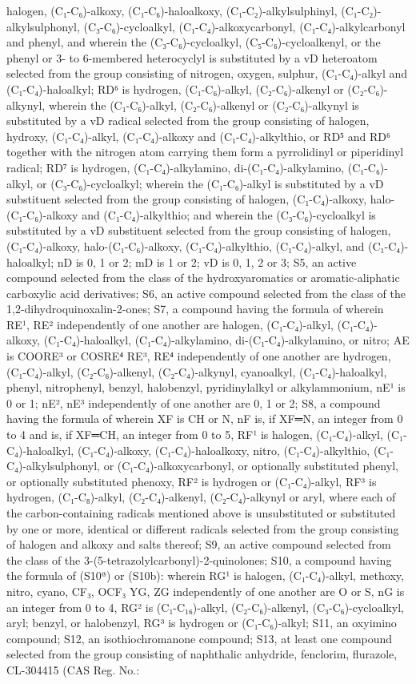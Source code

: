 \documentclass[11pt,a4paper]{article}
\begin{document}
halogen, (C₁-C₆)-alkoxy, (C₁-C₆)-haloalkoxy, (C₁-C₂)-alkylsulphinyl, (C₁-C₂)-alkylsulphonyl, (C₃-C₆)-cycloalkyl, (C₁-C₄)-alkoxycarbonyl, (C₁-C₄)-alkylcarbonyl and phenyl, and wherein the (C₃-C₆)-cycloalkyl, (C₅-C₆)-cycloalkenyl, or the phenyl or 3- to 6-membered heterocyclyl is substituted by a vD heteroatom selected from the group consisting of nitrogen, oxygen, sulphur, (C₁-C₄)-alkyl and (C₁-C₄)-haloalkyl; RD⁶ is hydrogen, (C₁-C₆)-alkyl, (C₂-C₆)-alkenyl or (C₂-C₆)-alkynyl, wherein the (C₁-C₆)-alkyl, (C₂-C₆)-alkenyl or (C₂-C₆)-alkynyl is substituted by a vD radical selected from the group consisting of halogen, hydroxy, (C₁-C₄)-alkyl, (C₁-C₄)-alkoxy and (C₁-C₄)-alkylthio, or RD⁵ and RD⁶ together with the nitrogen atom carrying them form a pyrrolidinyl or piperidinyl radical; RD⁷ is hydrogen, (C₁-C₄)-alkylamino, di-(C₁-C₄)-alkylamino, (C₁-C₆)-alkyl, or (C₃-C₆)-cycloalkyl; wherein the (C₁-C₆)-alkyl is substituted by a vD substituent selected from the group consisting of halogen, (C₁-C₄)-alkoxy, halo-(C₁-C₆)-alkoxy and (C₁-C₄)-alkylthio; and wherein the (C₃-C₆)-cycloalkyl is substituted by a vD substituent selected from the group consisting of halogen, (C₁-C₄)-alkoxy, halo-(C₁-C₆)-alkoxy, (C₁-C₄)-alkylthio, (C₁-C₄)-alkyl, and (C₁-C₄)-haloalkyl; nD is 0, 1 or 2; mD is 1 or 2; vD is 0, 1, 2 or 3; S5, an active compound selected from the class of the hydroxyaromatics or aromatic-aliphatic carboxylic acid derivatives; S6, an active compound selected from the class of the 1,2-dihydroquinoxalin-2-ones; S7, a compound having the formula of wherein RE¹, RE² independently of one another are halogen, (C₁-C₄)-alkyl, (C₁-C₄)-alkoxy, (C₁-C₄)-haloalkyl, (C₁-C₄)-alkylamino, di-(C₁-C₄)-alkylamino, or nitro; AE is COORE³ or COSRE⁴ RE³, RE⁴ independently of one another are hydrogen, (C₁-C₄)-alkyl, (C₂-C₆)-alkenyl, (C₂-C₄)-alkynyl, cyanoalkyl, (C₁-C₄)-haloalkyl, phenyl, nitrophenyl, benzyl, halobenzyl, pyridinylalkyl or alkylammonium, nE¹ is 0 or 1; nE², nE³ independently of one another are 0, 1 or 2; S8, a compound having the formula of wherein XF is CH or N, nF is, if XF═N, an integer from 0 to 4 and is, if XF═CH, an integer from 0 to 5, RF¹ is halogen, (C₁-C₄)-alkyl, (C₁-C₄)-haloalkyl, (C₁-C₄)-alkoxy, (C₁-C₄)-haloalkoxy, nitro, (C₁-C₄)-alkylthio, (C₁-C₄)-alkylsulphonyl, or (C₁-C₄)-alkoxycarbonyl, or optionally substituted phenyl, or optionally substituted phenoxy, RF² is hydrogen or (C₁-C₄)-alkyl, RF³ is hydrogen, (C₁-C₈)-alkyl, (C₂-C₄)-alkenyl, (C₂-C₄)-alkynyl or aryl, where each of the carbon-containing radicals mentioned above is unsubstituted or substituted by one or more, identical or different radicals selected from the group consisting of halogen and alkoxy and salts thereof; S9, an active compound selected from the class of the 3-(5-tetrazolylcarbonyl)-2-quinolones; S10, a compound having the formula of (S10ª) or (S10b): wherein RG¹ is halogen, (C₁-C₄)-alkyl, methoxy, nitro, cyano, CF₃, OCF₃ YG, ZG independently of one another are O or S, nG is an integer from 0 to 4, RG² is (C₁-C₁₆)-alkyl, (C₂-C₆)-alkenyl, (C₃-C₆)-cycloalkyl, aryl; benzyl, or halobenzyl, RG³ is hydrogen or (C₁-C₆)-alkyl; S11, an oxyimino compound; S12, an isothiochromanone compound; S13, at least one compound selected from the group consisting of naphthalic anhydride, fenclorim, flurazole, CL-304415 (CAS Reg. No.: 
\end{document}
